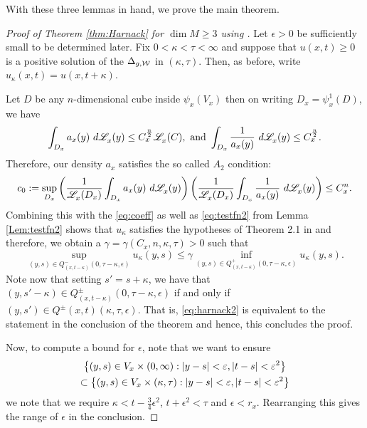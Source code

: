 \documentclass[a4paper, 12pt]{amsart}
\begin{document}
With these three lemmas in hand, we prove the main theorem.

\begin{proof}[Proof of Theorem \ref{thm:Harnack} for $\dim M \geq 3$ using \cite{CS}]
Let $\epsilon > 0$ be sufficiently small to 
be determined later. 
Fix $0 < \kappa < \tau < \infty$ and suppose that $u(x,t) \geq 0$ 
is a positive solution of
the $\Delta_{g,\mathcal{W}}$ in $(\kappa,\tau)$. 
Then, as before, write $u_\kappa(x,t) = u(x,t+\kappa)$.

Let $D$ be any $n$-dimensional cube inside $\psi_x(V_x)$ then 
on writing $D_x = \psi_x^{1}(D)$, we have  
$$ \int_{D_x} a_x(y)\ d\Leb_x(y) \leq C_x^{\frac{n}{2}} \Leb_x(C),
\ \text{and}\ 
\int_{D_x} \frac{1}{a_x(y)}\ d\Leb_x(y) \leq C_x^{\frac{n}{2}}.$$
Therefore, our density $a_x$ satisfies the so called $A_2$ condition:
$$c_0 := \sup_{D_x} \left( \frac{1}{\mathscr{L}^{{}}_x(D_x)} \int_{D_x} a_x(y)\ d\mathscr{L}^{{}}_x(y)\right)
\left( \frac{1}{\mathscr{L}^{{}}_x(D_x)} \int_{D_x} \frac{1}{a_x(y)}\ d\mathscr{L}^{{}}_x(y)\right) 
	\leq C_x^n.$$
Combining this with the \eqref{eq:coeff} as
well as \eqref{eq:testfn2} from Lemma \ref{Lem:testfn2} shows that $u_\kappa$
satisfies the hypotheses of Theorem 2.1 in \cite{CS} and
therefore, we obtain a $\gamma = \gamma(C_x, n, \kappa, \tau) > 0$
such that 
\begin{equation} 
\label{eq:harnack2} 
\sup_{(y,s) \in Q_{(x,t-\kappa)}^-(0, \tau - \kappa, \epsilon)} u_\kappa(y,s)
		\leq \gamma \inf_{(y,s) \in Q^+_{(x,t-\kappa)}(0, \tau - \kappa, \epsilon)} u_\kappa(y,s).
\end{equation}
Note now that setting $s' = s + \kappa$, we have that
$(y, s' - \kappa) \in Q^{\pm}_{(x,t- \kappa)}(0, \tau - \kappa, \epsilon)$
if and only if $(y, s') \in Q^{\pm}(x,t)(\kappa, \tau, \epsilon)$.
That is, \eqref{eq:harnack2} is equivalent to the statement 
in the conclusion of the theorem and hence, this concludes
the proof.

Now, to compute a bound for $\epsilon$, note that
we want to ensure 
\begin{multline*}\left\{(y,s) \in V_x \times (0, \infty): |y - s| < \varepsilon, |t - s| < \varepsilon^2\right\} \\
\subset \left\{(y,s) \in V_x \times (\kappa, \tau): |y - s| < \varepsilon, |t - s| < \varepsilon^2\right\}
\end{multline*} 
we note that we require $\kappa < t - \frac{3}{4} \epsilon^2$,
$t + \epsilon^2 < \tau$ and $\epsilon < r_x$.
Rearranging this gives the range of $\epsilon$
in the conclusion.
\end{proof} 
\end{document}
